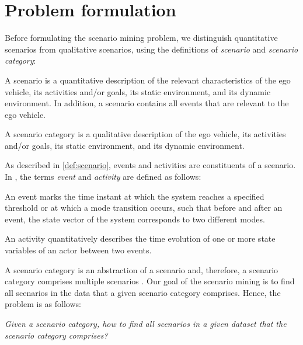 \section{Problem formulation}
\label{sec:problem}

Before formulating the scenario mining problem, we distinguish quantitative scenarios from qualitative scenarios, using the definitions of \emph{scenario} and \emph{scenario category}:

\begin{definition}
	\label{def:scenario}
	A scenario is a quantitative description of the relevant characteristics of the ego vehicle, its activities and/or goals, its static environment, and its dynamic environment. In addition, a scenario contains all events that are relevant to the ego vehicle.
\end{definition}

\begin{definition}
	\label{def:scenario category}
	A scenario category is a qualitative description of the ego vehicle, its activities and/or goals, its static environment, and its dynamic environment.
\end{definition}

As described in \cref{def:scenario}, events and activities are constituents of a scenario. In \autocite{degelder2018ontology}, the terms \emph{event} and \emph{activity} are defined as follows:
\begin{definition}
	\label{def:event}
	An event marks the time instant at which the system reaches a specified threshold or at which a mode transition occurs, such that before and after an event, the state vector of the system corresponds to two different modes.
\end{definition}
\begin{definition}
	\label{def:activity}
	An activity quantitatively describes the time evolution of one or more state variables of an actor between two events.
\end{definition}


A scenario category is an abstraction of a scenario and, therefore, a scenario category comprises multiple scenarios \autocite{degelder2018ontology}. Our goal of the scenario mining is to find all scenarios in the data that a given scenario category comprises. Hence, the problem is as follows:

\emph{Given a scenario category, how to find all scenarios in a given dataset that the scenario category comprises?}


%
